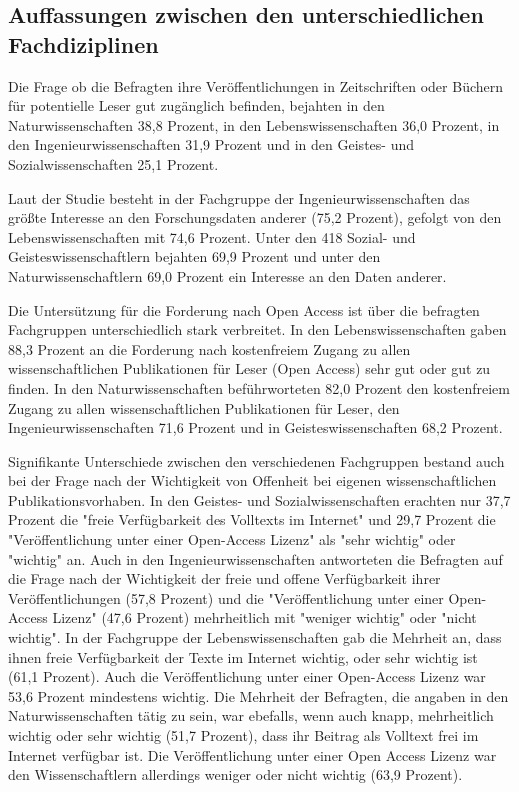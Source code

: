 \subsection{Auffassungen zwischen den unterschiedlichen Fachdiziplinen}

Die Frage ob die Befragten ihre Veröffentlichungen in Zeitschriften oder Büchern für potentielle Leser gut zugänglich befinden, bejahten in den Naturwissenschaften 38,8 Prozent, in den Lebenswissenschaften 36,0 Prozent, in den Ingenieurwissenschaften 31,9 Prozent und in den Geistes- und Sozialwissenschaften 25,1 Prozent.

Laut der Studie besteht in der Fachgruppe der Ingenieurwissenschaften das größte Interesse an den Forschungsdaten anderer (75,2 Prozent), gefolgt von den Lebenswissenschaften mit 74,6 Prozent. Unter den 418 Sozial- und Geisteswissenschaftlern bejahten 69,9 Prozent und unter den Naturwissenschaftlern 69,0 Prozent ein Interesse an den Daten anderer.

Die Untersützung für die Forderung nach Open Access ist über die befragten Fachgruppen unterschiedlich stark verbreitet. In den Lebenswissenschaften gaben 88,3 Prozent an die Forderung nach kostenfreiem Zugang zu allen wissenschaftlichen Publikationen für Leser (Open Access) sehr gut oder gut zu finden. In den Naturwissenschaften beführworteten 82,0 Prozent den kostenfreiem Zugang zu allen wissenschaftlichen Publikationen für Leser, den Ingenieurwissenschaften 71,6 Prozent und in Geisteswissenschaften 68,2 Prozent.

Signifikante Unterschiede zwischen den verschiedenen Fachgruppen bestand auch bei der Frage nach der Wichtigkeit von Offenheit bei eigenen wissenschaftlichen Publikationsvorhaben. In den Geistes- und Sozialwissenschaften erachten nur 37,7 Prozent die "freie Verfügbarkeit des Volltexts im Internet" und 29,7 Prozent die "Veröffentlichung unter einer Open-Access Lizenz" als "sehr wichtig" oder "wichtig" an. Auch in den Ingenieurwissenschaften antworteten die Befragten auf die Frage nach der Wichtigkeit der freie und offene Verfügbarkeit ihrer Veröffentlichungen (57,8 Prozent) und die "Veröffentlichung unter einer Open-Access Lizenz" (47,6 Prozent) mehrheitlich mit "weniger wichtig" oder "nicht wichtig". In der Fachgruppe der Lebenswissenschaften gab die Mehrheit an, dass ihnen freie Verfügbarkeit der Texte im Internet wichtig, oder sehr wichtig ist (61,1 Prozent). Auch die Veröffentlichung unter einer Open-Access Lizenz war 53,6 Prozent mindestens wichtig. Die Mehrheit der Befragten, die angaben in den Naturwissenschaften tätig zu sein, war ebefalls, wenn auch knapp, mehrheitlich wichtig oder sehr wichtig (51,7 Prozent), dass ihr Beitrag als Volltext frei im Internet verfügbar ist. Die Veröffentlichung unter einer Open Access Lizenz war den Wissenschaftlern allerdings weniger oder nicht wichtig (63,9 Prozent).

